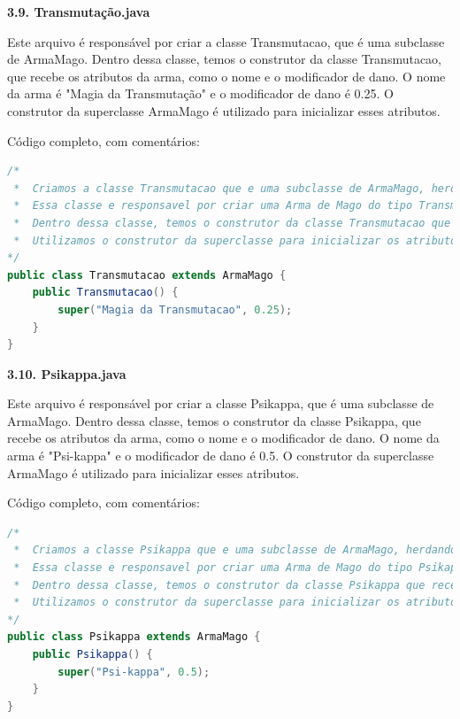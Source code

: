 \documentclass[11pt]{uiobrev}
\begin{document}
\vspace{0.5cm}
\Large \textbf{3.9. Transmutação.java}

Este arquivo é responsável por criar a classe Transmutacao, que é uma subclasse de ArmaMago. Dentro dessa classe, temos o construtor da classe Transmutacao, que recebe os atributos da arma, como o nome e o modificador de dano. O nome da arma é "Magia da Transmutação" e o modificador de dano é 0.25. O construtor da superclasse ArmaMago é utilizado para inicializar esses atributos.

Código completo, com comentários: 

\begin{lstlisting}[language=Java, caption={Classe Transmutacao, subclasse de ArmaMago}]
/*
 *  Criamos a classe Transmutacao que e uma subclasse de ArmaMago, herdando os atributos de ArmaMago.
 *  Essa classe e responsavel por criar uma Arma de Mago do tipo Transmutacao.
 *  Dentro dessa classe, temos o construtor da classe Transmutacao que recebe o nome e o dano da arma.
 *  Utilizamos o construtor da superclasse para inicializar os atributos de ArmaMago.
*/
public class Transmutacao extends ArmaMago {
    public Transmutacao() {
        super("Magia da Transmutacao", 0.25);
    }
}
\end{lstlisting}

\newpage
\Large \textbf{3.10. Psikappa.java}

Este arquivo é responsável por criar a classe Psikappa, que é uma subclasse de ArmaMago. Dentro dessa classe, temos o construtor da classe Psikappa, que recebe os atributos da arma, como o nome e o modificador de dano. O nome da arma é "Psi-kappa" e o modificador de dano é 0.5. O construtor da superclasse ArmaMago é utilizado para inicializar esses atributos.

Código completo, com comentários: 

\begin{lstlisting}[language=Java, caption={Classe Psikappa, subclasse de ArmaMago}]
/*
 *  Criamos a classe Psikappa que e uma subclasse de ArmaMago, herdando os atributos de ArmaMago.
 *  Essa classe e responsavel por criar uma Arma de Mago do tipo Psikappa.
 *  Dentro dessa classe, temos o construtor da classe Psikappa que recebe o nome e o dano da arma.
 *  Utilizamos o construtor da superclasse para inicializar os atributos de ArmaMago.
*/
public class Psikappa extends ArmaMago {
    public Psikappa() {
        super("Psi-kappa", 0.5);
    }
}
\end{lstlisting}
\end{document}
